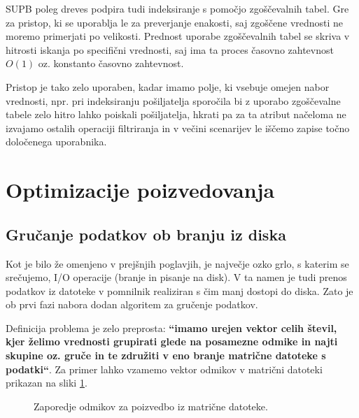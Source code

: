 \documentclass[a4paper,12pt,openright]{book}
\begin{document}
        SUPB poleg dreves podpira tudi indeksiranje s pomočjo zgoščevalnih tabel. Gre za pristop, ki se uporablja le za preverjanje enakosti, saj zgoščene vrednosti ne moremo primerjati po velikosti.
        Prednost uporabe zgoščevalnih tabel se skriva v hitrosti iskanja po specifični vrednosti, saj ima ta proces časovno zahtevnost $O(1)$ oz. konstanto časovno zahtevnost.
        
        Pristop je tako zelo uporaben, kadar imamo polje, ki vsebuje omejen nabor vrednosti, npr. pri indeksiranju pošiljatelja sporočila bi z uporabo zgoščevalne tabele zelo hitro lahko poiskali pošiljatelja, hkrati pa za ta atribut načeloma ne izvajamo ostalih operaciji filtriranja in v večini scenarijev le iščemo zapise točno določenega uporabnika.

    \section{Optimizacije poizvedovanja}
        
        \subsection{Gručanje podatkov ob branju iz diska}
        
        Kot je bilo že omenjeno v prejšnjih poglavjih, je največje ozko grlo, s katerim se srečujemo, I/O operacije (branje in pisanje na disk). V ta namen je tudi prenos podatkov iz datoteke v pomnilnik realiziran s čim manj dostopi do diska. Zato je ob prvi fazi nabora dodan algoritem za gručenje podatkov.

        Definicija problema je zelo preprosta: \textbf{``imamo urejen vektor celih števil, kjer želimo vrednosti grupirati glede na posamezne odmike in najti skupine oz. gruče in te združiti v eno branje matrične datoteke s podatki``}. Za primer lahko vzamemo vektor odmikov v matrični datoteki prikazan na sliki \ref{clustering_no_color}.

\hfill \break
\begin{figure}[h]
\begin{center}
\caption{Zaporedje odmikov za poizvedbo iz matrične datoteke.}
\label{clustering_no_color}
\end{center}
\end{figure}
\end{document}
